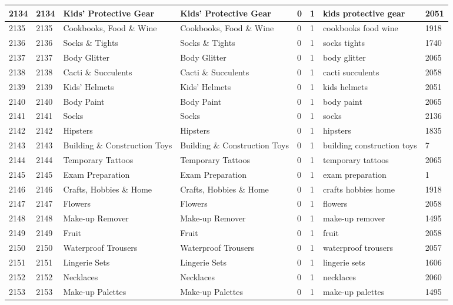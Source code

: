 \begin{longtable}{|l|l|l|l|l|l|l|l|}
2134 & 2134 & Kids' Protective Gear & Kids' Protective Gear & 0 & 1 & kids protective gear & 2051 \\ \hline 
2135 & 2135 & Cookbooks, Food \& Wine & Cookbooks, Food \& Wine & 0 & 1 & cookbooks food wine & 1918 \\ \hline 
2136 & 2136 & Socks \& Tights & Socks \& Tights & 0 & 1 & socks tights & 1740 \\ \hline 
2137 & 2137 & Body Glitter & Body Glitter & 0 & 1 & body glitter & 2065 \\ \hline 
2138 & 2138 & Cacti \& Succulents & Cacti \& Succulents & 0 & 1 & cacti succulents & 2058 \\ \hline 
2139 & 2139 & Kids' Helmets & Kids' Helmets & 0 & 1 & kids helmets & 2051 \\ \hline 
2140 & 2140 & Body Paint & Body Paint & 0 & 1 & body paint & 2065 \\ \hline 
2141 & 2141 & Socks & Socks & 0 & 1 & socks & 2136 \\ \hline 
2142 & 2142 & Hipsters & Hipsters & 0 & 1 & hipsters & 1835 \\ \hline 
2143 & 2143 & Building \& Construction Toys & Building \& Construction Toys & 0 & 1 & building construction toys & 7 \\ \hline 
2144 & 2144 & Temporary Tattoos & Temporary Tattoos & 0 & 1 & temporary tattoos & 2065 \\ \hline 
2145 & 2145 & Exam Preparation & Exam Preparation & 0 & 1 & exam preparation & 1 \\ \hline 
2146 & 2146 & Crafts, Hobbies \& Home & Crafts, Hobbies \& Home & 0 & 1 & crafts hobbies home & 1918 \\ \hline 
2147 & 2147 & Flowers & Flowers & 0 & 1 & flowers & 2058 \\ \hline 
2148 & 2148 & Make-up Remover & Make-up Remover & 0 & 1 & make-up remover & 1495 \\ \hline 
2149 & 2149 & Fruit & Fruit & 0 & 1 & fruit & 2058 \\ \hline 
2150 & 2150 & Waterproof Trousers & Waterproof Trousers & 0 & 1 & waterproof trousers & 2057 \\ \hline 
2151 & 2151 & Lingerie Sets & Lingerie Sets & 0 & 1 & lingerie sets & 1606 \\ \hline 
2152 & 2152 & Necklaces & Necklaces & 0 & 1 & necklaces & 2060 \\ \hline 
2153 & 2153 & Make-up Palettes & Make-up Palettes & 0 & 1 & make-up palettes & 1495 \\ \hline 

\end{longtable}
